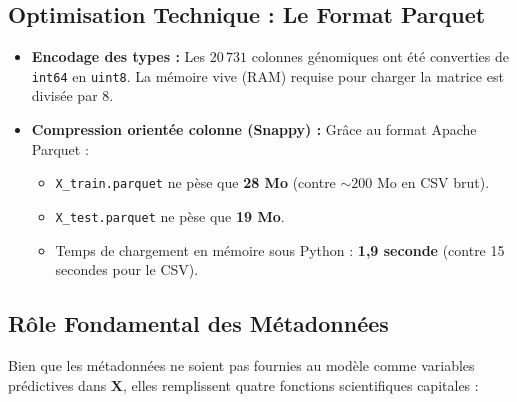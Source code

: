 \documentclass[11pt,a4paper]{article}
\begin{document}
\subsection{Optimisation Technique : Le Format Parquet}

\begin{itemize}[leftmargin=*, label=$\bullet$]
    \item \textbf{Encodage des types :} Les $20\,731$ colonnes génomiques ont été converties de \texttt{int64} en \texttt{uint8}. La mémoire vive (RAM) requise pour charger la matrice est divisée par 8.
    \item \textbf{Compression orientée colonne (Snappy) :} Grâce au format Apache Parquet \citep{vohra2016apache} :
    \begin{itemize}
        \item \texttt{X\_train.parquet} ne pèse que \textbf{28 Mo} (contre $\sim 200$ Mo en CSV brut).
        \item \texttt{X\_test.parquet} ne pèse que \textbf{19 Mo}.
        \item Temps de chargement en mémoire sous Python : \textbf{1,9 seconde} (contre 15 secondes pour le CSV).
    \end{itemize}
\end{itemize}

\subsection{Rôle Fondamental des Métadonnées}

Bien que les métadonnées ne soient pas fournies au modèle comme variables prédictives dans $\mathbf{X}$, elles remplissent quatre fonctions scientifiques capitales :
\end{document}
